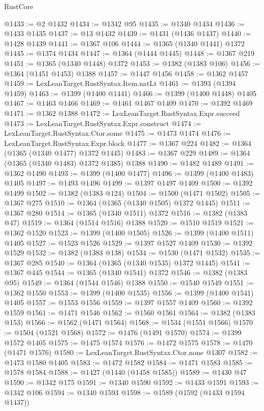 \begin{lexlean}{RustCore}
\begin{coremodule}
@1433 := @2 @1432
@1434 := @1342 @95
@1435 := @1340 @1434
@1436 := @1433 @1435
@1437 := @13 @1432
@1439 := @1431 (@1436 @1437)
@1440 := @1428 @1439
@1441 := @1367 @106
@1444 := @1365 (@1340 @1441) @1372
@1445 := @1374 @1434
@1447 := @1364 (@1444 @1445)
@1448 := @1367 @219
@1451 := @1365 (@1340 @1448) @1372
@1453 := @1382 (@1383 @106)
@1456 := @1364 (@1451 @1453) @1388
@1457 := @1447 @1456
@1458 := @1362 @1457
@1459 := LexLeanTarget.RustSyntax.Item.natLt
@1461 := @1393 (@1394 @1459)
@1463 := @1399 (@1400 @1441)
@1466 := @1399 (@1400 @1448) @1405
@1467 := @1463 @1466
@1469 := @1461 @1467 @1409
@1470 := @1392 @1469
@1471 := @1362 @1388
@1472 := LexLeanTarget.RustSyntax.Expr.succeed
@1473 := LexLeanTarget.RustSyntax.Expr.construct
@1474 := LexLeanTarget.RustSyntax.Ctor.some
@1475 := @1473 @1474
@1476 := LexLeanTarget.RustSyntax.Expr.block
@1477 := @1367 @224
@1482 := @1364 (@1365 (@1340 @1477) @1372 @1445)
@1483 := @1367 @229
@1489 := @1364 (@1365 (@1340 @1483) @1372 @1385) @1388
@1490 := @1482 @1489
@1491 := @1362 @1490
@1493 := @1399 (@1400 @1477)
@1496 := @1399 (@1400 @1483) @1405
@1497 := @1493 @1496
@1499 := @1397 @1497 @1409
@1500 := @1392 @1499
@1502 := @1382 (@1383 @124)
@1504 := @1500 (@1471 @1502)
@1505 := @1367 @275
@1510 := @1364 (@1365 (@1340 @1505) @1372 @1445)
@1511 := @1367 @280
@1514 := @1365 (@1340 @1511) @1372
@1516 := @1382 (@1383 @47)
@1519 := @1364 (@1514 @1516) @1388
@1520 := @1510 @1519
@1521 := @1362 @1520
@1523 := @1399 (@1400 @1505)
@1526 := @1399 (@1400 @1511) @1405
@1527 := @1523 @1526
@1529 := @1397 @1527 @1409
@1530 := @1392 @1529
@1532 := @1382 (@1383 @138)
@1534 := @1530 (@1471 @1532)
@1535 := @1367 @285
@1540 := @1364 (@1365 (@1340 @1535) @1372 @1445)
@1541 := @1367 @445
@1544 := @1365 (@1340 @1541) @1372
@1546 := @1382 (@1383 @95)
@1549 := @1364 (@1544 @1546) @1388
@1550 := @1540 @1549
@1551 := @1362 @1550
@1553 := @1399 (@1400 @1535)
@1556 := @1399 (@1400 @1541) @1405
@1557 := @1553 @1556
@1559 := @1397 @1557 @1409
@1560 := @1392 @1559
@1561 := @1471 @1546
@1562 := @1560 @1561
@1564 := @1382 (@1383 @153)
@1566 := @1562 (@1471 @1564)
@1568 := @1534 (@1551 @1566)
@1570 := @1504 (@1521 @1568)
@1572 := @1476 (@1491 @1570)
@1574 := @1399 @1572 @1405
@1575 := @1475 @1574
@1576 := @1472 @1575
@1578 := @1470 (@1471 @1576)
@1580 := LexLeanTarget.RustSyntax.Ctor.none @1307
@1582 := @1473 @1580 @1405
@1583 := @1472 @1582
@1584 := @1471 @1583
@1585 := @1578 @1584
@1588 := @1427 (@1440 (@1458 @1585))
@1589 := @1430 @47
@1590 := @1342 @175
@1591 := @1340 @1590
@1592 := @1433 @1591
@1593 := @1342 @106
@1594 := @1340 @1593
@1598 := @1589 (@1592 (@1433 @1594 @1437))

\end{coremodule}
\end{lexlean}
